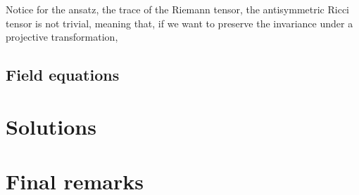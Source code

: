 \documentclass{article}
\begin{document}
Notice for the ansatz, the trace of the Riemann tensor, the antisymmetric Ricci tensor
is not trivial, meaning that, if we want to preserve the invariance under 
a projective transformation, 


\subsection{Field equations}



\section{Solutions}
\label{sec:solutions}


\section{Final remarks}
\label{sec:final_remarks}
\end{document}
